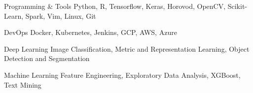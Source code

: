 

\begin{cvskills}

  \cvskill
    {Programming \& Tools} %
    {Python, R, Tensorflow, Keras, Horovod, OpenCV, Scikit-Learn, Spark, Vim, Linux, Git} %

  \cvskill
    {DevOps} %
    {Docker, Kubernetes, Jenkins, GCP, AWS, Azure} %

  \cvskill
    {Deep Learning} %
    {Image Classification, Metric and Representation Learning, Object Detection and Segmentation} %

  \cvskill
    {Machine Learning} %
    {Feature Engineering, Exploratory Data Analysis, XGBoost, Text Mining} %

\end{cvskills}
